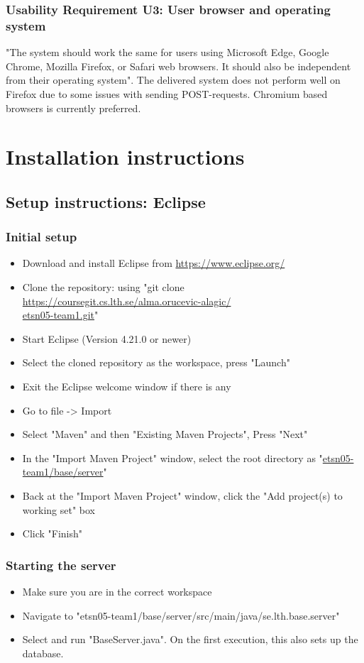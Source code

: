 \documentclass{article}
\begin{document}
\subsubsection{Usability Requirement U3: User browser and operating system}
"The system should work the same for users using Microsoft Edge, Google Chrome, Mozilla Firefox, or Safari web browsers. It should also be independent from their operating system"\cite{PRD}. The delivered system does not perform well on Firefox due to some issues with sending POST-requests. Chromium based browsers is currently preferred.



\section{Installation instructions} %
\subsection{Setup instructions: Eclipse}
\subsubsection{Initial setup}
\begin{itemize}
\item Download and install Eclipse from \url{https://www.eclipse.org/}
\item Clone the repository: using "git clone \url{https://coursegit.cs.lth.se/alma.orucevic-alagic/} \\ 
\url{etsn05-team1.git}"
\item Start Eclipse (Version 4.21.0 or newer)
\item Select the cloned repository as the workspace, press "Launch"
\item Exit the Eclipse welcome window if there is any
\item Go to file -> Import
\item Select "Maven" and then "Existing Maven Projects", Press "Next"
\item In the "Import Maven Project" window, select the root directory as "\url{etsn05-team1/base/server}"
\item Back at the "Import Maven Project" window, click the "Add project(s) to working set" box
\item Click "Finish"
\end{itemize}

\subsubsection{Starting the server}
\begin{itemize}
\item Make sure you are in the correct workspace
\item Navigate to "etsn05-team1/base/server/src/main/java/se.lth.base.server"
\item Select and run "BaseServer.java". On the first execution, this also sets up the database.
\end{itemize}
\end{document}
